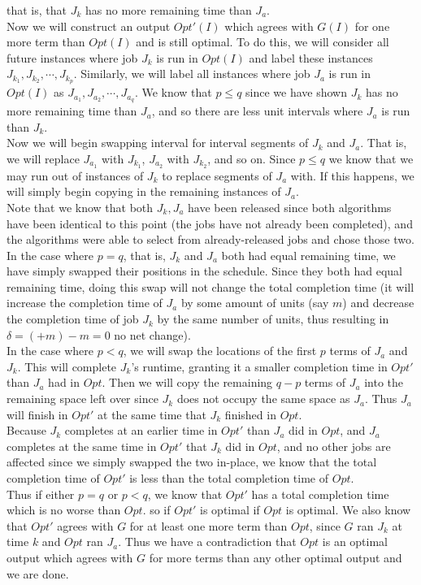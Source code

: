 \documentclass[11pt]{article}
\begin{document}
that is, that $J_k$ has no more remaining time than $J_a$.\\
Now we will construct an output $Opt'(I)$ which agrees with $G(I)$ for one more term than $Opt(I)$ and is still optimal. To do this, we will consider all future instances where job $J_k$ is run in $Opt(I)$ and label these instances $J_{k_1}, J_{k_2}, \cdots , J_{k_p}$. Similarly, we will label all instances where job $J_a$ is run in $Opt(I)$ as $J_{a_1}, J_{a_2}, \cdots , J_{a_q}$. We know that $p \le q$ since we have shown $J_k$ has no more remaining time than $J_a$, and so there are less unit intervals where $J_a$ is run than $J_k$.\\
Now we will begin swapping interval for interval segments of $J_k$ and $J_a$. That is, we will replace $J_{a_1}$ with $J_{k_1}$,  $J_{a_2}$ with $J_{k_2}$, and so on. Since $p \le q$ we know that we may run out of instances of $J_k$ to replace segments of $J_a$ with. If this happens, we will simply begin copying in the remaining instances of $J_a$.\\
Note that we know that both $J_k, J_a$ have been released since both algorithms have been identical to this point (the jobs have not already been completed), and the algorithms were able to select from already-released jobs and chose those two.\\
In the case where $p = q$, that is, $J_k$ and $J_a$ both had equal remaining time, we have simply swapped their positions in the schedule. Since they both had equal remaining time, doing this swap will not change the total completion time (it will increase the completion time of $J_a$ by some amount of units (say $m$) and decrease the completion time of job $J_k$ by the same number of units, thus resulting in $\delta = (+m) - m = 0$ no net change).\\
In the case where $p < q$, we will swap the locations of the first $p$ terms of $J_a$ and $J_k$. This will complete $J_k$'s runtime, granting it a smaller completion time in $Opt'$ than $J_a$ had in $Opt$. Then we will copy the remaining $q - p$ terms of $J_a$ into the remaining space left over since $J_k$ does not occupy the same space as $J_a$. Thus $J_a$ will finish in $Opt'$ at the same time that $J_k$ finished in $Opt$.\\
Because $J_k$ completes at an earlier time in $Opt'$ than $J_a$ did in $Opt$, and $J_a$ completes at the same time in $Opt'$ that $J_k$ did in $Opt$, and no other jobs are affected since we simply swapped the two in-place, we know that the total completion time of $Opt'$ is less than the total completion time of $Opt$.\\
Thus if either $p = q$ or $p < q$, we know that $Opt'$ has a total completion time which is no worse than $Opt$. so if $Opt'$ is optimal if $Opt$ is optimal. We also know that $Opt'$ agrees with $G$ for at least one more term than $Opt$, since $G$ ran $J_k$ at time $k$ and $Opt$ ran $J_a$. Thus we have a contradiction that $Opt$ is an optimal output which agrees with $G$ for more terms than any other optimal output and we are done.
\end{document}
